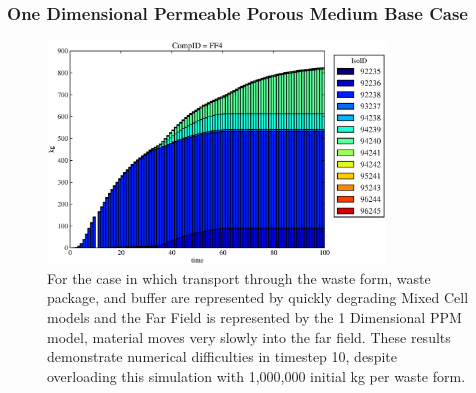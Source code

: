 \begin{frame}[ctb!]
  \frametitle{One Dimensional Permeable Porous Medium Base Case}
\begin{figure}[ht]
\includegraphics[width=0.8\textwidth]{./images/1dppmff.eps}
\caption[$^{235}U$ residence 1 Dimensional PPM Model.]{
For the case in which transport through the waste form, waste package, and 
buffer are represented by quickly degrading Mixed Cell models and the Far Field 
is represented by the 1 Dimensional PPM model, material moves very slowly into 
the far field. These results demonstrate numerical difficulties in timestep 10, 
despite overloading this simulation with 1,000,000 initial kg per waste form.
}
\label{fig:1dppmall}
\end{figure}
\end{frame}
